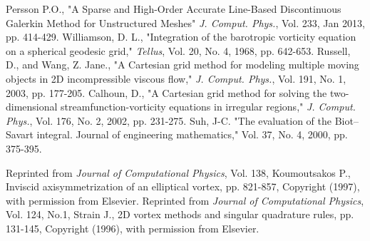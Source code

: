 \documentclass[]{aiaa-tc}%
\begin{document}
\begin{thebibliography}{9}
Persson P.O., "A Sparse and High-Order Accurate Line-Based Discontinuous Galerkin Method for Unstructured Meshes" \textit{J. Comput. Phys.}, Vol. 233, Jan 2013, pp. 414-429.
Williamson, D. L., "Integration of the barotropic vorticity equation on a spherical geodesic grid," \textit{Tellus}, Vol. 20, No. 4, 1968, pp. 642-653.
Russell, D., and Wang, Z. Jane., "A Cartesian grid method for modeling multiple moving objects in 2D incompressible viscous flow," \textit{J. Comput. Phys.}, Vol. 191, No. 1, 2003, pp. 177-205.
Calhoun, D., "A Cartesian grid method for solving the two-dimensional streamfunction-vorticity equations in irregular regions," \textit{J. Comput. Phys.}, Vol. 176, No. 2, 2002, pp. 231-275.
Suh, J-C. "The evaluation of the Biot–Savart integral. Journal of engineering mathematics," Vol. 37, No. 4, 2000, pp. 375-395.

Reprinted from \textit{Journal of Computational Physics}, Vol. 138, Koumoutsakos P., Inviscid axisymmetrization of an elliptical vortex, pp. 821-857, Copyright (1997), with permission from Elsevier.
Reprinted from \textit{Journal of Computational Physics}, Vol. 124, No.1, Strain J., 2D vortex methods and singular quadrature rules, pp. 131-145, Copyright (1996), with permission from Elsevier.
\end{thebibliography}
\end{document}
